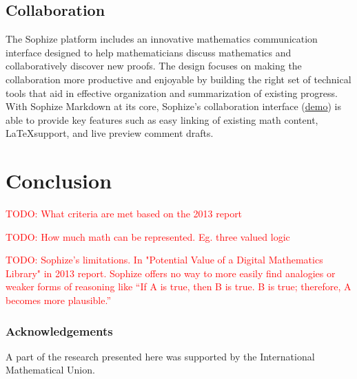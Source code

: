 \documentclass[runningheads]{llncs}
\newcommand\todo[1]{\textcolor{red}{TODO: #1}}
\begin{document}
\subsection{Collaboration}

The Sophize platform includes an innovative mathematics communication interface designed to help
mathematicians discuss mathematics and collaboratively discover new proofs. The design focuses on
making the collaboration more productive and enjoyable by building the right set of technical
tools that aid in effective organization and summarization of existing progress.
With Sophize Markdown at its core, Sophize's collaboration interface\cite{todo}  (\underline{\href{https://youtu.be/d3gaalJ7UQM}{demo}}) is able to provide key features such as easy linking of existing math content, \LaTeX\space support, and live preview comment drafts.


\section{Conclusion}
\label{sec:conclusion}
\todo{What criteria are met based on the 2013 report}

\todo{How much math can be represented. Eg. three valued logic}

\todo{Sophize's limitations. In "Potential Value of a
Digital Mathematics Library" in 2013 report. Sophize offers no way to more easily find analogies or weaker forms of reasoning like “If A is true, then B is true. B is true; therefore, A becomes more plausible.” }


\subsubsection{Acknowledgements} 
A part of the research presented here was supported by the International Mathematical Union.



%
%
%


\end{document}
